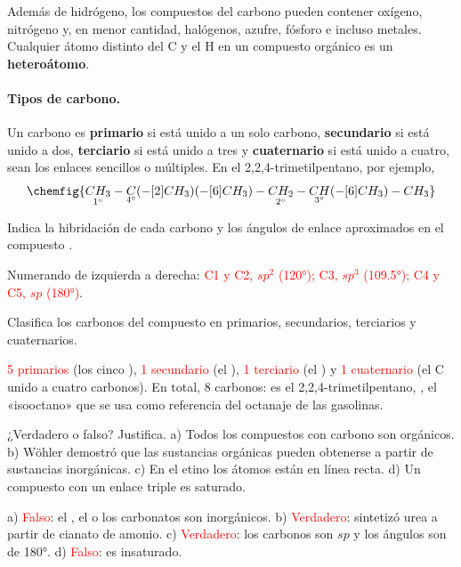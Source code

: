 Además de hidrógeno, los compuestos del carbono pueden contener oxígeno, nitrógeno y, en menor cantidad, halógenos, azufre, fósforo e
incluso metales. Cualquier átomo distinto del C y el H en un compuesto orgánico es un \textbf{heteroátomo}.

\paragraph{Tipos de carbono.} Un carbono es \textbf{primario} si está unido a un solo carbono, \textbf{secundario} si está unido a
dos, \textbf{terciario} si está unido a tres y \textbf{cuaternario} si está unido a cuatro, sean los enlaces sencillos o múltiples.
En el 2,2,4-trimetilpentano, por ejemplo,
\[ \chemfig{\underset{1^\circ}{CH_3}-\underset{4^\circ}{C}(-[2]CH_3)(-[6]CH_3)-\underset{2^\circ}{CH_2}-\underset{3^\circ}{CH}(-[6]CH_3)-CH_3} \]

\begin{exercise}
    Indica la hibridación de cada carbono y los ángulos de enlace aproximados en el compuesto .
    \begin{solu}
        Numerando de izquierda a derecha: \textcolor{red}{C1 y C2, \(sp^2\) (\ang{120}); C3, \(sp^3\) (\ang{109.5}); C4 y C5,
        \(sp\) (\ang{180})}.
    \end{solu}
\end{exercise}

\begin{exercise}
    Clasifica los carbonos del compuesto  en primarios, secundarios,
    terciarios y cuaternarios.
    \begin{solu}
        \textcolor{red}{5 primarios} (los cinco ), \textcolor{red}{1 secundario} (el ), \textcolor{red}{1
        terciario} (el ) y \textcolor{red}{1 cuaternario} (el C unido a cuatro carbonos). En total, 8 carbonos: es el
        2,2,4-trimetilpentano, , el «isooctano» que se usa como referencia del octanaje de las gasolinas.
    \end{solu}
\end{exercise}

\begin{exercise}
    ¿Verdadero o falso? Justifica. a) Todos los compuestos con carbono son orgánicos. b) Wöhler demostró que las sustancias
    orgánicas pueden obtenerse a partir de sustancias inorgánicas. c) En el etino los átomos están en línea recta. d) Un compuesto
    con un enlace triple es saturado.
    \begin{solu}
        a) \textcolor{red}{Falso}: el , el  o los carbonatos son inorgánicos. b) \textcolor{red}{Verdadero}: sintetizó
        urea a partir de cianato de amonio. c) \textcolor{red}{Verdadero}: los carbonos son \(sp\) y los ángulos son de
        \ang{180}. d) \textcolor{red}{Falso}: es insaturado.
    \end{solu}
\end{exercise}

